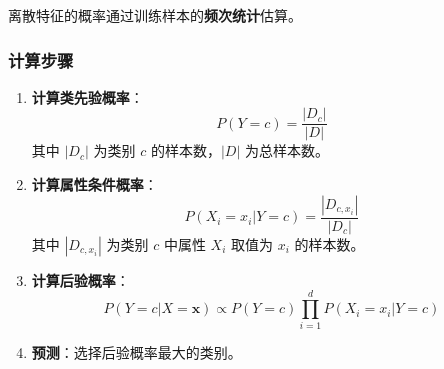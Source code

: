 \documentclass[12pt,a4paper]{ctexart}
\begin{document}
离散特征的概率通过训练样本的\textbf{频次统计}估算。

\subsubsection{计算步骤}

\begin{enumerate}
    \item \textbf{计算类先验概率}：
    \[
    P(Y=c) = \frac{|D_c|}{|D|}
    \]
    其中 $|D_c|$ 为类别 $c$ 的样本数，$|D|$ 为总样本数。
    
    \item \textbf{计算属性条件概率}：
    \[
    P(X_i=x_i | Y=c) = \frac{|D_{c,x_i}|}{|D_c|}
    \]
    其中 $|D_{c,x_i}|$ 为类别 $c$ 中属性 $X_i$ 取值为 $x_i$ 的样本数。
    
    \item \textbf{计算后验概率}：
    \[
    P(Y=c | X=\mathbf{x}) \propto P(Y=c) \prod_{i=1}^{d} P(X_i=x_i | Y=c)
    \]
    
    \item \textbf{预测}：选择后验概率最大的类别。
\end{enumerate}
\end{document}
